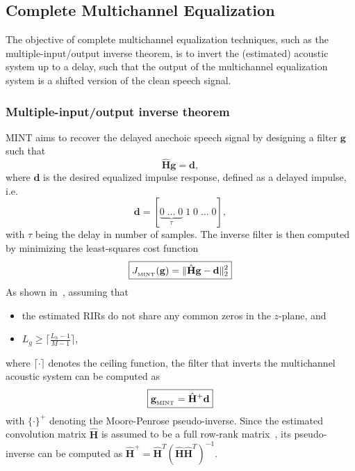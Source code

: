 \documentclass[10pt]{IEEEtran}
\begin{document}
\subsection{Complete Multichannel Equalization}
\label{subsec: mint}
The objective of complete multichannel equalization techniques, such as the multiple-input/output inverse theorem, is to invert the (estimated) acoustic system up to a delay, such that the output of the multichannel equalization system is a shifted version of the clean speech signal.
\subsubsection*{Multiple-input/output inverse theorem~\cite{Miyoshi_ITASS_1988}}
MINT aims to recover the delayed anechoic speech signal by designing a filter $\mathbf{g}$ such that
\begin{equation}
  \label{eq: minttar}
  \hat{\mathbf{H}}\mathbf{g} = \mathbf{d},
\end{equation}
where $\mathbf{d}$ is the desired equalized impulse response, defined as a delayed impulse, i.e.
\begin{equation}
  \mathbf{d} = [\underbrace{0 \; \ldots \; 0}_{\tau} \; 1 \; 0 \; \ldots \; 0 ],
\end{equation}
with $\tau$ being the delay in number of samples.
The inverse filter is then computed by minimizing the least-squares cost function
\begin{equation}
\label{eq: ls}
\boxed{J_{_{\rm MINT}}(\mathbf{g}) = \|\hat{\mathbf{H}}\mathbf{g} - \mathbf{d}\|_2^2}
\end{equation}
As shown in~\cite{Miyoshi_ITASS_1988}, assuming that
\begin{itemize}
  \item the estimated RIRs do not share any common zeros in the $z$-plane, and
  \item $L_g \geq \lceil{\frac{L_h-1}{M-1}\rceil}$,
\end{itemize}
where $\lceil{ \cdot \rceil}$ denotes the ceiling function, the filter that inverts the multichannel acoustic system can be computed as
\begin{equation}
  \label{eq: mint}
  \boxed{\mathbf{g}_{{}_{\rm MINT}} = \hat{\mathbf{H}}^+\mathbf{d}}
\end{equation}
with $\{\cdot\}^+$ denoting the Moore-Penrose pseudo-inverse.
Since the estimated convolution matrix $\hat{\mathbf{H}}$ is assumed to be a full row-rank matrix~\cite{Harikumar_ITSP_1998}, its pseudo-inverse can be computed as $\hat{\mathbf{H}}^+ = \hat{\mathbf{H}}^T(\hat{\mathbf{H}}\hat{\mathbf{H}}^T)^{-1}$.
\end{document}
